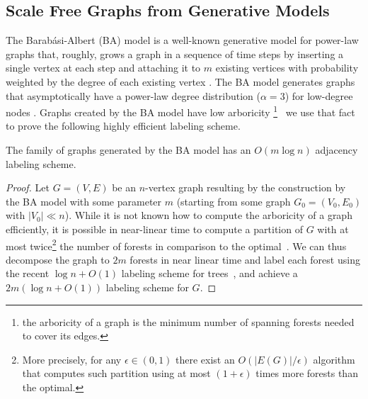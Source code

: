 \subsection{Scale Free  Graphs from Generative Models}\label{Sec:ScaleFree}
The Barab{\'a}si-Albert (BA) model is a well-known generative model for power-law graphs that, roughly, grows a graph in a sequence of time steps by
inserting a single vertex at each step and attaching it to $m$ existing vertices with probability weighted by the degree of each existing vertex \cite{barabasi1999emergence}. The BA model
generates graphs that asymptotically have a power-law degree distribution ($\alpha = 3$) for low-degree nodes \cite{DBLP:journals/rsa/BollobasRST01}.
Graphs created by the BA model have low arboricity \footnote{the arboricity of a graph is the minimum number of spanning forests needed to cover its edges.}~\cite{goel2006bounded} we use
that fact to prove the following highly efficient labeling scheme. 



\begin{proposition}\label{Th:baLabeling}
The family of graphs generated by the BA model has an $O(m \log n)$ adjacency labeling scheme.
\end{proposition}

\begin{proof}
Let  $G=(V,E)$  be an $n$-vertex graph resulting by the construction  by the BA model with some parameter $m$ (starting from some graph $G_0 = (V_0,E_0)$ with $\vert V_0 \vert \ll n$).
While it is not known how to compute the   arboricity of a graph efficiently, it is possible in near-linear time to compute a partition of $G$ with  at most twice\footnote{More precisely, for any $\epsilon \in (0,1)$  there exist an $O(|E(G)| / \epsilon)$ algorithm~\cite{kowalik2006approximation} that computes such partition using at most $(1+ \epsilon)$ times more forests than the optimal.} the number of forests in comparison to the optimal~\cite{arikati1997efficient}.
We can thus decompose the graph to $2m$ forests in near linear time and label each forest using the recent $\log n + O(1)$ labeling scheme for trees~\cite{alstrup2015optimal},  and achieve a $2m (\log n+O(1))$ labeling scheme for $G$.
\end{proof}

